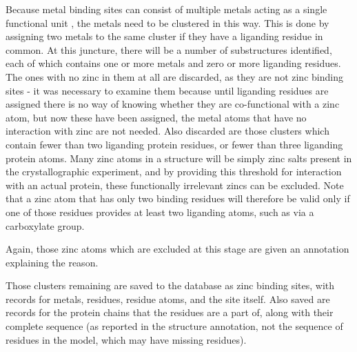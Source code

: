 Because metal binding sites can consist of multiple metals acting as a single functional unit , the metals need to be clustered in this way. This is done by assigning two metals to the same cluster if they have a liganding residue in common. At this juncture, there will be a number of substructures identified, each of which contains one or more metals and zero or more liganding residues. The ones with no zinc in them at all are discarded, as they are not zinc binding sites - it was necessary to examine them because until liganding residues are assigned there is no way of knowing whether they are co-functional with a zinc atom, but now these have been assigned, the metal atoms that have no interaction with zinc are not needed. Also discarded are those clusters which contain fewer than two liganding protein residues, or fewer than three liganding protein atoms. Many zinc atoms in a structure will be simply zinc salts present in the crystallographic experiment, and by providing this threshold for interaction with an actual protein, these functionally irrelevant zincs can be excluded. Note that a zinc atom that has only two binding residues will therefore be valid only if one of those residues provides at least two liganding atoms, such as via a carboxylate group.

Again, those zinc atoms which are excluded at this stage are given an annotation explaining the reason.

Those clusters remaining are saved to the database as zinc binding sites, with records for metals, residues, residue atoms, and the site itself. Also saved are records for the protein chains that the residues are a part of, along with their complete sequence (as reported in the structure annotation, not the sequence of residues in the model, which may have missing residues).

